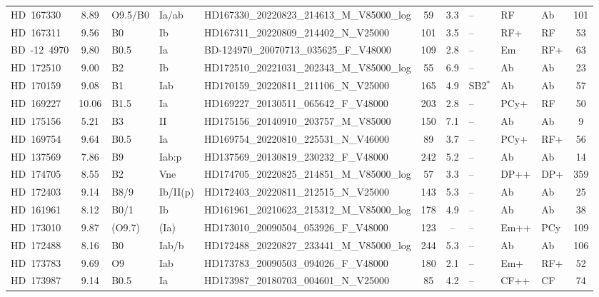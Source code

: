 {\begin{landscape}
\begin{longtable}{lclllcclllc}
\noalign{\smallskip}
HD~167330 & 8.89 & O9.5/B0 & Ia/ab & HD167330\_20220823\_214613\_M\_V85000\_log & 59 & 3.3 & -- & RF & Ab & 101 \\
\noalign{\smallskip}
HD~167311 & 9.56 & B0 & Ib & HD167311\_20220809\_214402\_N\_V25000 & 101 & 3.5 & -- & RF+ & RF & 53 \\
\noalign{\smallskip}
BD~-12~4970 & 9.80 & B0.5 & Ia & BD-124970\_20070713\_035625\_F\_V48000 & 109 & 2.8 & -- & Em & RF+ & 63 \\
\noalign{\smallskip}
HD~172510 & 9.00 & B2 & Ib & HD172510\_20221031\_202343\_M\_V85000\_log & 55 & 6.9 & -- & Ab & Ab & 23 \\
\noalign{\smallskip}
HD~170159 & 9.08 & B1 & Iab & HD170159\_20220811\_211106\_N\_V25000 & 165 & 4.9 & SB2$^{*}$ & Ab & Ab & 57 \\
\noalign{\smallskip}
HD~169227 & 10.06 & B1.5 & Ia & HD169227\_20130511\_065642\_F\_V48000 & 203 & 2.8 & -- & PCy+ & RF & 50 \\
\noalign{\smallskip}
HD~175156 & 5.21 & B3 & II & HD175156\_20140910\_203757\_M\_V85000 & 150 & 7.1 & -- & Ab & Ab & 9 \\
\noalign{\smallskip}
HD~169754 & 9.64 & B0.5 & Ia & HD169754\_20220810\_225531\_N\_V46000 & 89 & 3.7 & -- & PCy+ & RF+ & 56 \\
\noalign{\smallskip}
HD~137569 & 7.86 & B9 & Iab:p & HD137569\_20130819\_230232\_F\_V48000 & 242 & 5.2 & -- & Ab & Ab & 14 \\
\noalign{\smallskip}
HD~174705 & 8.55 & B2 & Vne & HD174705\_20220825\_214851\_M\_V85000\_log & 57 & 3.3 & -- & DP++ & DP+ & 359 \\
\noalign{\smallskip}
HD~172403 & 9.14 & B8/9 & Ib/II(p) & HD172403\_20220811\_212515\_N\_V25000 & 143 & 5.3 & -- & Ab & Ab & 25 \\
\noalign{\smallskip}
HD~161961 & 8.12 & B0/1 & Ib & HD161961\_20210623\_215312\_M\_V85000\_log & 178 & 4.9 & -- & Ab & Ab & 38 \\
\noalign{\smallskip}
HD~173010 & 9.87 & (O9.7) & (Ia) & HD173010\_20090504\_053926\_F\_V48000 & 123 & -- & -- & Em++ & PCy & 109 \\
\noalign{\smallskip}
HD~172488 & 8.16 & B0 & Iab/b & HD172488\_20220827\_233441\_M\_V85000\_log & 244 & 5.3 & -- & Ab & Ab & 106 \\
\noalign{\smallskip}
HD~173783 & 9.69 & O9 & Iab & HD173783\_20090503\_094026\_F\_V48000 & 180 & 2.1 & -- & Em+ & RF+ & 52 \\
\noalign{\smallskip}
HD~173987 & 9.14 & B0.5 & Ia & HD173987\_20180703\_004601\_N\_V25000 & 85 & 4.2 & -- & CF++ & CF & 74 \\

\end{longtable}
\end{landscape}}
